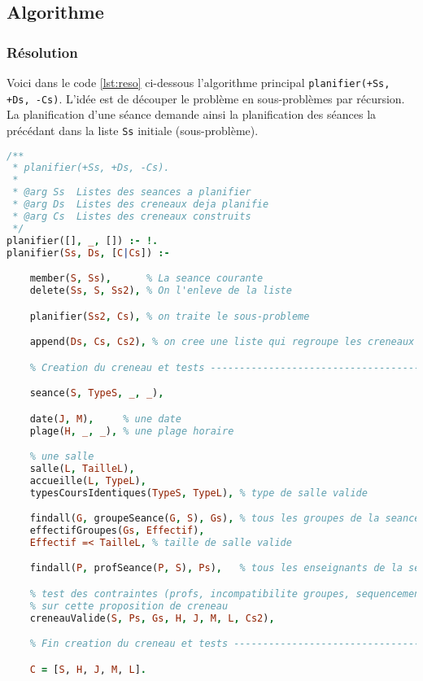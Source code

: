 
\subsection{Algorithme}

\subsubsection{Résolution}

Voici dans le code \ref{lst:reso} ci-dessous l'algorithme principal
\texttt{planifier(+Ss, +Ds, -Cs)}.
L'idée est de découper le problème en sous-problèmes par récursion. La
planification d'une séance demande ainsi la planification des séances la
précédant dans la liste \texttt{Ss} initiale (sous-problème).

\begin{lstlisting}[language=Prolog, caption=Resolution, captionpos=b,
label={lst:reso}]
/**
 * planifier(+Ss, +Ds, -Cs).
 *
 * @arg Ss  Listes des seances a planifier
 * @arg Ds  Listes des creneaux deja planifie
 * @arg Cs  Listes des creneaux construits
 */
planifier([], _, []) :- !.
planifier(Ss, Ds, [C|Cs]) :-

    member(S, Ss),      % La seance courante
    delete(Ss, S, Ss2), % On l'enleve de la liste

    planifier(Ss2, Cs), % on traite le sous-probleme

    append(Ds, Cs, Cs2), % on cree une liste qui regroupe les creneaux existants

    % Creation du creneau et tests ---------------------------------------------

    seance(S, TypeS, _, _),

    date(J, M),     % une date
    plage(H, _, _), % une plage horaire

    % une salle
    salle(L, TailleL),
    accueille(L, TypeL),
    typesCoursIdentiques(TypeS, TypeL), % type de salle valide

    findall(G, groupeSeance(G, S), Gs), % tous les groupes de la seance
    effectifGroupes(Gs, Effectif),
    Effectif =< TailleL, % taille de salle valide

    findall(P, profSeance(P, S), Ps),   % tous les enseignants de la seance

    % test des contraintes (profs, incompatibilite groupes, sequencement)
    % sur cette proposition de creneau
    creneauValide(S, Ps, Gs, H, J, M, L, Cs2),

    % Fin creation du creneau et tests -----------------------------------------

    C = [S, H, J, M, L].
\end{lstlisting}


